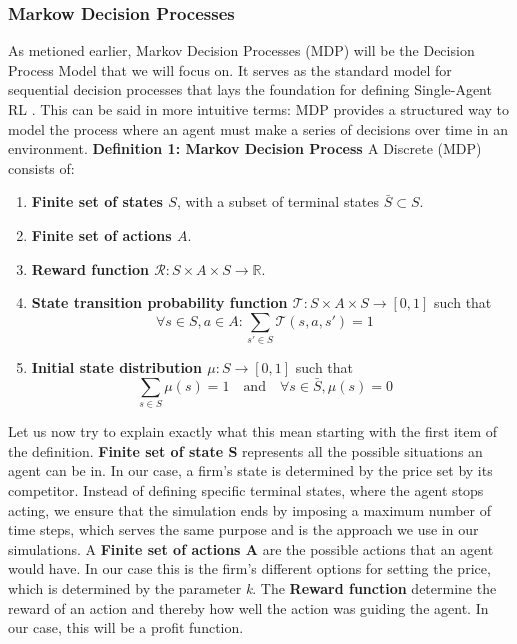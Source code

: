 \documentclass{article}
\begin{document}
\subsubsection{Markow Decision Processes}
As metioned earlier, Markov Decision Processes (MDP) will be the Decision Process Model that we will focus on. It serves as the standard model for sequential decision processes that lays the foundation for
defining Single-Agent RL \citep[p. 19-22]{marl-book}. This can be said in more intuitive terms: MDP provides a structured way to model the process where an agent must make a series of decisions over time in an environment.
\newline
\textbf{Definition 1: Markov Decision Process \citep[p. 22]{marl-book}} A Discrete (MDP) consists of:
\begin{enumerate}
    \item \textbf{Finite set of states \( S \)}, with a subset of terminal states \( \bar{S} \subset S \).
    \item \textbf{Finite set of actions \( A \)}.
    \item \textbf{Reward function \( \mathcal{R}: S \times A \times S  \to \mathbb{R} \)}.
    \item \textbf{State transition probability function \( \mathcal{T}: S \times A \times S \to [0, 1] \)} such that
    \[
    \forall s \in S, a \in A : \sum_{s' \in S} \mathcal{T}(s, a, s') = 1 \quad 
    \]
    \item \textbf{Initial state distribution \( \mu: S \to [0, 1] \)} such that
    \[
    \sum_{s \in S} \mu(s) = 1 \quad \text{and} \quad \forall s \in \bar{S}, \mu(s) = 0 \quad 
    \]
\end{enumerate}
Let us now try to explain exactly what this mean starting with the first item of the definition.
\newline 
\textbf{Finite set of state S} represents all the possible situations an agent can be in. In our case, a firm's state is determined by the price set by its competitor. Instead of defining specific terminal states, where the agent stops acting, we ensure that the simulation ends by imposing a maximum number of time steps, which serves the same purpose and is the approach we use in our simulations.
\newline
A \textbf{Finite set of actions A} are the possible actions that an agent would have. In our case this is the firm's different options for setting the price, which is determined by the parameter \textit{k}. 
\newline
The \textbf{Reward function} determine the reward of an action and thereby how well the action was guiding the agent. In our case, this will be a profit function. 
\end{document}
